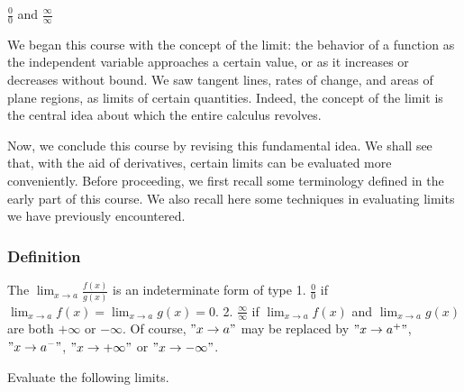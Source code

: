\documentclass[
  letterpaper,
  DIV=11,
  numbers=noendperiod]{scrartcl}
\theoremstyle{definition}
\theoremstyle{plain}
\theoremstyle{remark}
\begin{document}
\(\frac{0}{0}\) and \(\frac{\infty}{\infty}\)

We began this course with the concept of the limit: the behavior of a
function as the independent variable approaches a certain value, or as
it increases or decreases without bound. We saw tangent lines, rates of
change, and areas of plane regions, as limits of certain quantities.
Indeed, the concept of the limit is the central idea about which the
entire calculus revolves.

Now, we conclude this course by revising this fundamental idea. We shall
see that, with the aid of derivatives, certain limits can be evaluated
more conveniently. Before proceeding, we first recall some terminology
defined in the early part of this course. We also recall here some
techniques in evaluating limits we have previously encountered.

\hypertarget{def:Definition}{}
\hypertarget{definition}{%
\subsubsection{Definition}\label{definition}}

The \(\displaystyle\lim_{x \to a} \frac{f(x)}{g(x)}\) is an
indeterminate form of type 1. \(\frac{0}{0}\) if
\(\displaystyle\lim_{x \to a} f(x) = \displaystyle\lim_{x \to a} g(x)=0\).
2. \(\frac{\infty}{\infty}\) if \(\displaystyle\lim_{x \to a} f(x)\) and
\(\displaystyle\lim_{x \to a} g(x)\) are both \(+\infty\) or
\(-\infty\). Of course, \("x \to a"\) may be replaced by
\("x \to a^+"\), \("x \to a^-"\), \("x \to +\infty"\) or
\("x \to -\infty"\).

\leavevmode{}%
Evaluate the following limits.
\end{document}
